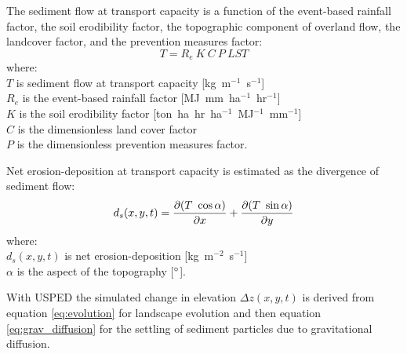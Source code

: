 \documentclass[gmd, manuscript]{copernicus}
\begin{document}
\noindent
The sediment flow at transport capacity is a function of 
the event-based rainfall factor, the soil erodibility factor, 
the topographic component of overland flow,
the landcover factor, and the prevention measures factor:
%
\begin{equation}
\label{eq:usped}
{T = R_e ~ K ~ C ~ P ~ LST}
\end{equation}
{\small
\noindent
where: \\
\noindent
\hspace*{0.5em} $T$ is sediment flow at transport capacity [\unit{kg~m}$^{-1}$~\unit{s}$^{-1}$]\\ 
\hspace*{0.5em} $R_e$ is the event-based rainfall factor [\unit{MJ~mm~ha}$^{-1}$~\unit{hr}$^{-1}$]\\
\hspace*{0.5em} $K$ is the soil erodibility factor [\unit{ton~ha~hr~ha}$^{-1}$~\unit{MJ}$^{-1}$~\unit{mm}$^{-1}$]\\ 
\hspace*{0.5em} $C$ is the dimensionless land cover factor\\
\hspace*{0.5em} $P$ is the dimensionless prevention measures factor.\\
}

\noindent
Net erosion-deposition at transport capacity is estimated as the divergence of sediment flow: 
\begin{equation}\label{eq:usped_erdep} 
d_s(x,y,t) = 
{\partial (T ~ \cos \alpha) \over \partial x} +
{\partial (T ~ \sin \alpha) \over \partial y}
\end{equation}
{\small
\noindent
where: \\
\hspace*{0.5em} $d_s(x,y,t)$ is net erosion-deposition [\unit{kg~m}$^{-2}$~\unit{s}$^{-1}$]\\
\hspace*{0.5em} $\alpha$ is the aspect of the topography [$^{\circ}$].\\
}

\noindent
With USPED the simulated change in elevation $\Delta z(x,y,t)$
is derived from equation \ref{eq:evolution} for landscape evolution
and then equation \ref{eq:grav_diffusion}
for the settling of sediment particles due to gravitational diffusion.

\end{document}

